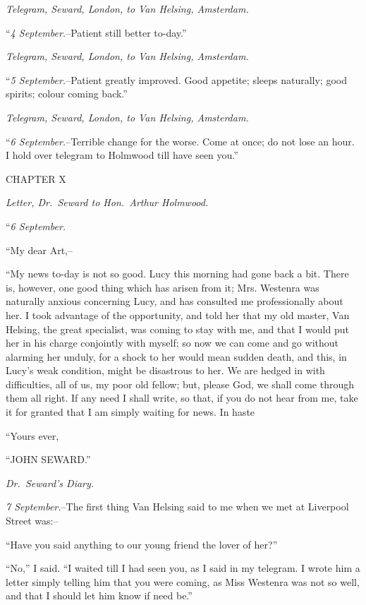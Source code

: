 \documentclass[12pt,openright]{book}
\begin{document}
\textit{Telegram, Seward, London, to Van Helsing, Amsterdam.}

“\textit{4 September.}–Patient still better to-day.”

\textit{Telegram, Seward, London, to Van Helsing, Amsterdam.}

“\textit{5 September.}–Patient greatly improved. Good appetite; sleeps naturally; good spirits; colour coming back.”

\textit{Telegram, Seward, London, to Van Helsing, Amsterdam.}

“\textit{6 September.}–Terrible change for the worse. Come at once; do not lose an hour. I hold over telegram to Holmwood till have seen you.”

CHAPTER X

\textit{Letter, Dr. Seward to Hon. Arthur Holmwood.}

“\textit{6 September.}

“My dear Art,–

“My news to-day is not so good. Lucy this morning had gone back a bit. There is, however, one good thing which has arisen from it; Mrs. Westenra was naturally anxious concerning Lucy, and has consulted me professionally about her. I took advantage of the opportunity, and told her that my old master, Van Helsing, the great specialist, was coming to stay with me, and that I would put her in his charge conjointly with myself; so now we can come and go without alarming her unduly, for a shock to her would mean sudden death, and this, in Lucy’s weak condition, might be disastrous to her. We are hedged in with difficulties, all of us, my poor old fellow; but, please God, we shall come through them all right. If any need I shall write, so that, if you do not hear from me, take it for granted that I am simply waiting for news. In haste

“Yours ever,

“JOHN SEWARD.”

\textit{Dr. Seward’s Diary.}

\textit{7 September.}–The first thing Van Helsing said to me when we met at Liverpool Street was:–

“Have you said anything to our young friend the lover of her?”

“No,” I said. “I waited till I had seen you, as I said in my telegram. I wrote him a letter simply telling him that you were coming, as Miss Westenra was not so well, and that I should let him know if need be.”
\end{document}
